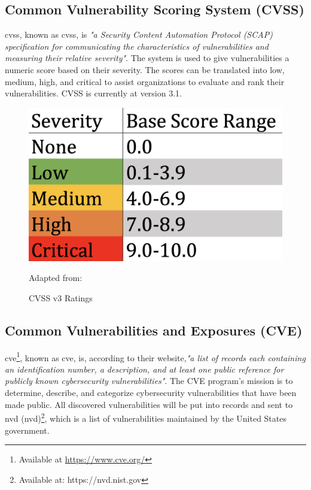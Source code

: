 \subsection{Common Vulnerability Scoring System (CVSS)}
\acrlong{cvss}, known as \acrshort{cvss}, is \textit{"a Security Content Automation Protocol (SCAP) specification for communicating the characteristics of vulnerabilities and measuring their relative severity"}\cite{nistCVSS}. The system is used to give vulnerabilities a numeric score based on their severity. The scores can be translated into low, medium, high, and critical to assist organizations to evaluate and rank their vulnerabilities. CVSS is currently at version 3.1. \cite{CVSS}
\begin{figure}[H]
    \centering
    \includegraphics[scale=0.3]{Images/CVSS.png}
    \caption{CVSS v3 Ratings} Adapted from:\cite{cvssrating}
    \label{fig:CVSS v3 Ratings}
\end{figure}


\subsection{Common Vulnerabilities and Exposures (CVE)}
\label{Common Vulnerabilities and Exposures}
\acrlong{cve}\footnote{Available at \url{https://www.cve.org/}}, known as \acrshort{cve}, is, according to their website,\textit{"a list of records each containing an identification number, a description, and at least one public reference for publicly known cybersecurity vulnerabilities"}\cite{CVE}. The CVE program's mission is to determine, describe, and categorize cybersecurity vulnerabilities that have been made public. All discovered vulnerabilities will be put into records and sent to \acrlong{nvd} (\acrshort{nvd})\footnote{Available at: https://nvd.nist.gov}, which is a list of vulnerabilities maintained by the United States government.

